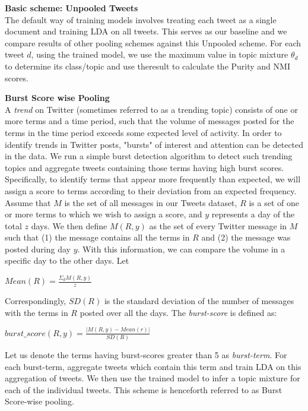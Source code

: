\documentclass[10pt,a5paper,twoside]{article}
\begin{document}
\begin{compactenum}

\item \textbf{Basic scheme: Unpooled Tweets}
\\
The default way of training models involves treating each tweet as a single document and training LDA on all tweets. This serves as our baseline and we compare results of other pooling schemes against this Unpooled scheme. For each tweet $d$, using the trained model, we use the maximum value in topic mixture $\theta_{d} $ to determine its class/topic and use theresult to calculate the Purity and NMI scores.
\\

\item \textbf{ Burst Score wise Pooling}
\\
A \textit{trend} on Twitter (sometimes referred to as a trending topic) consists of one or more terms and a time period, such that the volume of messages posted for the terms in the time period exceeds some expected level of activity. In order to identify trends in Twitter posts, "bursts" of interest and attention can be detected in the data. We run a simple burst detection algorithm to detect such trending topics and aggregate tweets containing those terms having high burst scores.
\\
Specifically, to identify terms that appear more frequently than expected, we will assign a score to terms according to their deviation from an expected frequency. Assume that $M$ is the set of all messages in our Tweets dataset, $R$ is a set of one or more terms to which we wish to assign a score, and $y$ represents a day of the total $z$ days. We then define $M(R, y)$ as the set of every Twitter message in $M$ such that (1) the message contains all the terms in $R$ and (2) the message was posted during day $y$. With this information, we can compare the volume in a specific day to the other days. Let 

\begin{center}
$ Mean(R) = \frac{\Sigma_d M(R,y)}{z} $
\end{center}

Correspondingly, $ SD(R) $ is the standard deviation of the number of messages with the terms in $R$ posted over all the days. The \textit{burst-score} is defined as:
\begin{center}
$ burst\_score(R,y) = \frac{|M(R,y) - Mean(r)|}{SD(R)} $
\end{center}

Let us denote the terms having burst-scores greater than 5 as \textit{burst-term}. For each burst-term, aggregate tweets which contain this term and train LDA on this aggregation of tweets. We then use the trained model to infer a topic mixture for each of the individual tweets. This scheme is henceforth referred to as Burst Score-wise pooling.
\\


\end{compactenum}
\end{document}
